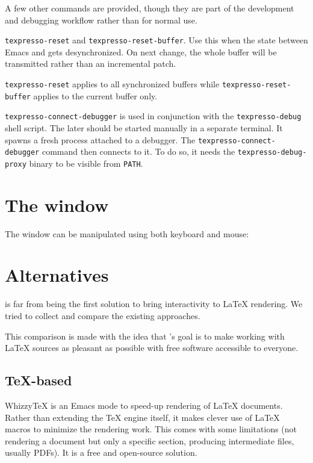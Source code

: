 \documentclass{article}
\begin{document}
A few other commands are provided, though they are part of the \txp development and debugging workflow rather than for normal use.

\texttt{texpresso-reset} and \texttt{texpresso-reset-buffer}. Use this when the state between Emacs and \txp gets desynchronized. On next change, the whole buffer will be transmitted rather than an incremental patch.

\texttt{texpresso-reset} applies to all synchronized buffers while \texttt{texpresso-reset-buffer} applies to the current buffer only.

\texttt{texpresso-connect-debugger} is used in conjunction with the \texttt{texpresso-debug} shell script. The later should be started manually in a separate terminal. It spawns a fresh \txp process attached to a debugger. The \texttt{texpresso-connect-debugger} command then connects to it. To do so, it needs the \texttt{texpresso-debug-proxy} binary to be visible from \texttt{PATH}.

\section{The \txp window}

The window can be manipulated using both keyboard and mouse:

\begin{itemize}

\end{itemize}

\section{Alternatives}

\txp is far from being the first solution to bring interactivity to \LaTeX{} rendering. We tried to collect and compare the existing approaches.

This comparison is made with the idea that \txp's goal is to make working with
\LaTeX{} sources as pleasant as possible with free software accessible to everyone.

\subsection{\TeX-based}

Whizzy\TeX{} is an Emacs mode to speed-up rendering of \LaTeX{} documents. Rather than extending the \TeX{} engine itself, it makes clever use of \LaTeX{} macros to minimize the rendering work.
This comes with some limitations (not rendering a document but only a specific section, producing intermediate files, usually PDFs). It is a free and open-source solution.
\end{document}
